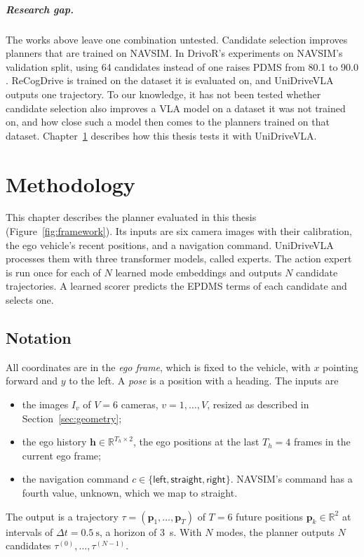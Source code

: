 \documentclass[11pt, a4paper, oneside]{book}
\begin{document}
\paragraph{Research gap.}
The works above leave one combination untested. Candidate selection improves planners that are
trained on NAVSIM. In DrivoR's experiments on NAVSIM's validation split, using 64 candidates
instead of one raises PDMS from 80.1 to 90.0 \cite{drivor}. ReCogDrive is trained on the dataset it is
evaluated on, and UniDriveVLA outputs one trajectory. To our knowledge,
it has not been tested whether candidate selection also improves a VLA model on a dataset it
was not trained on, and how close such a model then comes to the planners trained on that
dataset.
Chapter~\ref{ch:method} describes how this thesis tests it with UniDriveVLA.

\chapter{Methodology}
\label{ch:method}
This chapter describes the planner evaluated in this thesis (Figure~\ref{fig:framework}). Its
inputs are six camera images with their calibration, the ego vehicle's recent positions, and a
navigation command. UniDriveVLA \cite{unidrivevla} processes them with three transformer
models, called experts. The action expert is run once for each of $N$ learned mode embeddings
and outputs $N$ candidate trajectories. A learned scorer predicts the EPDMS terms of each
candidate and selects one.



\section{Notation}
\label{sec:notation}
All coordinates are in the \emph{ego frame}, which is fixed to the vehicle, with $x$ pointing
forward and $y$ to the left. A \emph{pose} is a position with a heading. The inputs are
\begin{itemize}
  \item the images $I_v$ of $V=6$ cameras, $v=1,\dots,V$, resized as described in
  Section~\ref{sec:geometry};
  \item the ego history $\mathbf{h}\in\mathbb{R}^{T_h\times 2}$, the ego positions at the last
  $T_h=4$ frames in the current ego frame;
  \item the navigation command $c\in\{\textsf{left},\textsf{straight},\textsf{right}\}$.
  NAVSIM's command has a fourth value, \textsf{unknown}, which we map to \textsf{straight}.
\end{itemize}
The output is a trajectory $\tau=(\mathbf{p}_1,\dots,\mathbf{p}_T)$ of $T=6$ future positions
$\mathbf{p}_k\in\mathbb{R}^2$ at intervals of $\Delta t=\SI{0.5}{\second}$, a horizon of
\SI{3}{\second}. With $N$ modes, the planner outputs $N$ candidates $\tau^{(0)},\dots,\tau^{(N-1)}$.
\end{document}
